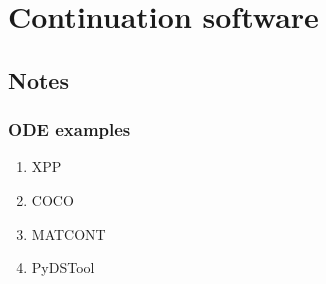 \documentclass[11pt]{article}
\begin{document}
\newpage
\section{Continuation software}
\label{sec:org1ce134e}
\subsection{Notes}
\label{sec:org21bc9dd}
\subsubsection{ODE examples}
\label{sec:org1bb742d}
\begin{enumerate}
\item XPP
\label{sec:org9bdee61}
\item COCO
\label{sec:org7ae5ac1}
\item MATCONT
\label{sec:org43922ba}
\item PyDSTool
\label{sec:org9a45589}
\end{enumerate}
\end{document}
